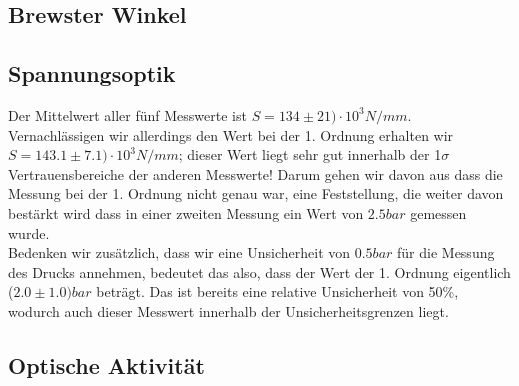 \documentclass{article}
\begin{document}
\subsection{Brewster Winkel}
\subsection{Spannungsoptik}

Der Mittelwert aller fünf Messwerte ist $S=134 \pm 21 )\cdot 10^3 N/mm$. Vernachlässigen wir allerdings den Wert bei der 1. Ordnung erhalten wir $S=143.1 \pm 7.1 )\cdot 10^3 N/mm$; dieser Wert liegt sehr gut innerhalb der 1$\sigma$ Vertrauensbereiche der anderen Messwerte! Darum gehen wir davon aus dass die Messung bei der 1. Ordnung nicht genau war, eine Feststellung, die weiter davon bestärkt wird dass in einer zweiten Messung ein Wert von $2.5 \si{bar}$ gemessen wurde.\\
Bedenken wir zusätzlich, dass wir eine Unsicherheit von $0.5 \si{bar}$ für die Messung des Drucks annehmen, bedeutet das also, dass der Wert der 1. Ordnung eigentlich ($2.0 \pm 1.0)\si{bar}$ beträgt. Das ist bereits eine relative Unsicherheit von 50\%, wodurch auch dieser Messwert innerhalb der Unsicherheitsgrenzen liegt. 

\subsection{Optische Aktivität}
																					
\end{document}

